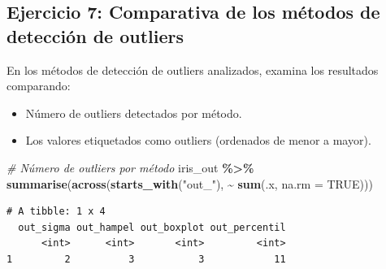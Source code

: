 \documentclass[
]{article}
\newenvironment{Shaded}{\begin{snugshade}}{\end{snugshade}}
\newcommand{\AttributeTok}[1]{\textcolor[rgb]{0.13,0.29,0.53}{#1}}
\newcommand{\CommentTok}[1]{\textcolor[rgb]{0.56,0.35,0.01}{\textit{#1}}}
\newcommand{\ConstantTok}[1]{\textcolor[rgb]{0.56,0.35,0.01}{#1}}
\newcommand{\ControlFlowTok}[1]{\textcolor[rgb]{0.13,0.29,0.53}{\textbf{#1}}}
\newcommand{\FunctionTok}[1]{\textcolor[rgb]{0.13,0.29,0.53}{\textbf{#1}}}
\newcommand{\NormalTok}[1]{#1}
\newcommand{\OtherTok}[1]{\textcolor[rgb]{0.56,0.35,0.01}{#1}}
\newcommand{\SpecialCharTok}[1]{\textcolor[rgb]{0.81,0.36,0.00}{\textbf{#1}}}
\newcommand{\StringTok}[1]{\textcolor[rgb]{0.31,0.60,0.02}{#1}}
\providecommand{\tightlist}{%
  \setlength{\itemsep}{0pt}\setlength{\parskip}{0pt}}
\begin{document}
\subsection{Ejercicio 7: Comparativa de los métodos de detección de
outliers}\label{ejercicio-7-comparativa-de-los-muxe9todos-de-detecciuxf3n-de-outliers}

En los métodos de detección de outliers analizados, examina los
resultados comparando:

\begin{itemize}
\tightlist
\item
  Número de outliers detectados por método.
\item
  Los valores etiquetados como outliers (ordenados de menor a mayor).
\end{itemize}

\begin{Shaded}
\begin{Highlighting}[]
\CommentTok{\# Número de outliers por método}
\NormalTok{iris\_out }\SpecialCharTok{\%\textgreater{}\%}
  \FunctionTok{summarise}\NormalTok{(}\FunctionTok{across}\NormalTok{(}\FunctionTok{starts\_with}\NormalTok{(}\StringTok{"out\_"}\NormalTok{), }\SpecialCharTok{\textasciitilde{}} \FunctionTok{sum}\NormalTok{(.x, }\AttributeTok{na.rm =} \ConstantTok{TRUE}\NormalTok{)))}
\end{Highlighting}
\end{Shaded}

\begin{verbatim}
# A tibble: 1 x 4
  out_sigma out_hampel out_boxplot out_percentil
      <int>      <int>       <int>         <int>
1         2          3           3            11
\end{verbatim}

\begin{Shaded}
\end{Shaded}
\end{document}
